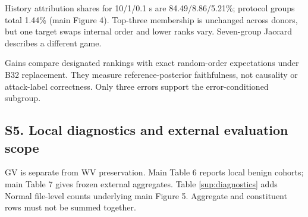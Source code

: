 \documentclass[10pt,a4paper]{article}
\begin{document}
History attribution shares for 10/1/0.1 s are 84.49/8.86/5.21\%; protocol groups total 1.44\% (main Figure 4). Top-three membership is unchanged across donors, but one target swaps internal order and lower ranks vary. Seven-group Jaccard describes a different game.

Gains compare designated rankings with exact random-order expectations under B32 replacement. They measure reference-posterior faithfulness, not causality or attack-label correctness. Only three errors support the error-conditioned subgroup.

\subsection*{S5. Local diagnostics and external evaluation scope}

GV is separate from WV preservation. Main Table 6 reports local benign cohorts; main Table 7 gives frozen external aggregates. Table \ref*{sup:diagnostics} adds Normal file-level counts underlying main Figure 5. Aggregate and constituent rows must not be summed together.
\end{document}
